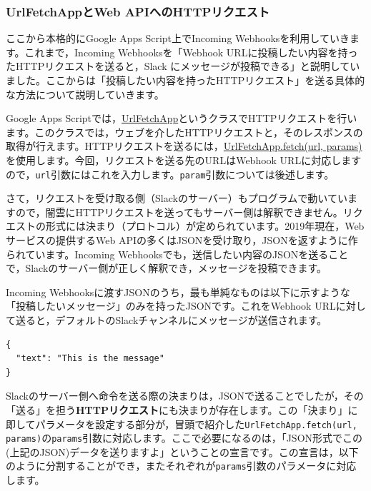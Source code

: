 \documentclass[uplatex,a4j]{jsarticle}
\begin{document}
\subsubsection{UrlFetchAppとWeb APIへのHTTPリクエスト}


ここから本格的にGoogle Apps Script上でIncoming Webhooksを利用していきます。これまで，Incoming Webhooksを「Webhook URLに投稿したい内容を持ったHTTPリクエストを送ると，Slack にメッセージが投稿できる」と説明していました。ここからは「投稿したい内容を持ったHTTPリクエスト」を送る具体的な方法について説明していきます。

Google Apps Scriptでは，\href{https://developers.google.com/apps-script/reference/url-fetch/url-fetch-app}{UrlFetchApp}というクラスでHTTPリクエストを行います。このクラスでは，ウェブを介したHTTPリクエストと，そのレスポンスの取得が行えます。HTTPリクエストを送るには，\href{https://developers.google.com/apps-script/reference/url-fetch/url-fetch-app#fetchurl,-params}{UrlFetchApp.fetch(url, params)}を使用します。今回，リクエストを送る先のURLはWebhook URLに対応しますので，\verb|url|引数にはこれを入力します。\verb|param|引数については後述します。


さて，リクエストを受け取る側（Slackのサーバー）もプログラムで動いていますので，闇雲にHTTPリクエストを送ってもサーバー側は解釈できません。リクエストの形式には決まり（プロトコル）が定められています。2019年現在，Webサービスの提供するWeb APIの多くはJSONを受け取り，JSONを返すように作られています。Incoming Webhooksでも，送信したい内容のJSONを送ることで，Slackのサーバー側が正しく解釈でき，メッセージを投稿できます。


Incoming Webhooksに渡すJSONのうち，最も単純なものは以下に示すような「投稿したいメッセージ」のみを持ったJSONです。これをWebhook URLに対して送ると，デフォルトのSlackチャンネルにメッセージが送信されます。
\begin{lstlisting}[basicstyle=\ttfamily\footnotesize,frame=single,caption=Minimum JSON payload for Incomming Webhooks,label=jsonpayload]
{
  "text": "This is the message"
}
\end{lstlisting}

Slackのサーバー側へ命令を送る際の決まりは，JSONで送ることでしたが，その「送る」を担う\textbf{HTTPリクエスト}にも決まりが存在します。この「決まり」に即してパラメータを設定する部分が，冒頭で紹介した\verb|UrlFetchApp.fetch(url, params)|の\verb|params|引数に対応します。ここで必要になるのは，「JSON形式でこの(上記のJSON)データを送りますよ」ということの宣言です。この宣言は，以下のように分割することができ，またそれぞれが\verb|params|引数のパラメータに対応します。
\end{document}
